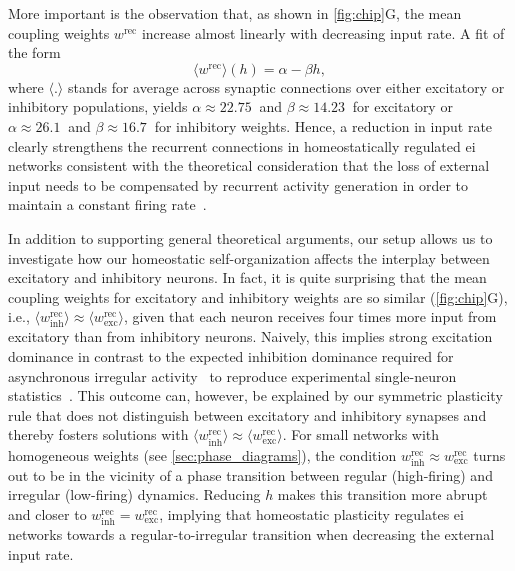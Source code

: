 More important is the observation that, as shown in \cref{fig:chip}G, the mean coupling weights $w^\mathrm{rec}$ increase almost linearly with decreasing input rate.
A fit of the form
\begin{equation}\label{eq:w-h}
    \langle w^\mathrm{rec}\rangle(h) = \alpha - \beta h,
\end{equation}
where $\langle.\rangle$ stands for average across synaptic connections over either excitatory or inhibitory populations, yields $\alpha\approx\SI{22.75}{}$ and $\beta\approx\SI{14.23}{}$ for excitatory or $\alpha\approx\SI{26.1}{}$ and $\beta\approx\SI{16.7}{}$ for inhibitory weights.
Hence, a reduction in input rate clearly strengthens the recurrent connections in homeostatically regulated \gls{ei} networks consistent with the theoretical consideration that the loss of external input needs to be compensated by recurrent activity generation in order to maintain a constant firing rate~\cite{zierenberg_homeostatic_2018}.



In addition to supporting general theoretical arguments, our setup allows us to investigate how our homeostatic self-organization affects the interplay between excitatory and inhibitory neurons.
In fact, it is quite surprising that the mean coupling weights for excitatory and inhibitory weights are so similar (\cref{fig:chip}G), i.e., $\langle w^\mathrm{rec}_\mathrm{inh} \rangle \approx \langle w^\mathrm{rec}_\mathrm{exc}\rangle$, given that each neuron receives four times more input from excitatory than from inhibitory neurons.
Naively, this implies strong excitation dominance in contrast to the expected inhibition dominance required for asynchronous irregular activity~\cite{vreeswijk_chaos_1996,brunel_dynamics_2000} to reproduce experimental single-neuron statistics~\cite{burns_spontaneous_1976, softky_highly_1993, stevens_input_1998, stein_neuronal_2005}.
This outcome can, however, be explained by our symmetric plasticity rule that does not distinguish between excitatory and inhibitory synapses and thereby fosters solutions with $\langle w^\mathrm{rec}_\mathrm{inh} \rangle \approx \langle w^\mathrm{rec}_\mathrm{exc}\rangle$.
For small networks with homogeneous weights (see \cref{sec:phase_diagrams}), the condition $w^\mathrm{rec}_\mathrm{inh} \approx w^\mathrm{rec}_\mathrm{exc}$ turns out to be in the vicinity of a phase transition between regular (high-firing) and irregular (low-firing) dynamics.
Reducing $h$ makes this transition more abrupt and closer to $w^\mathrm{rec}_\mathrm{inh} = w^\mathrm{rec}_\mathrm{exc}$, implying that homeostatic plasticity regulates \gls{ei} networks towards a regular-to-irregular transition when decreasing the external input rate.

